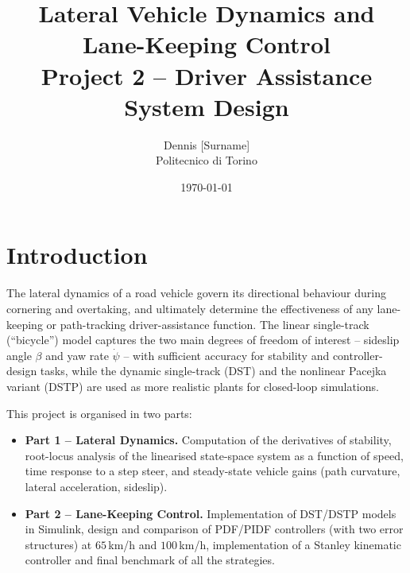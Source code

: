 %
%

\title{Lateral Vehicle Dynamics and Lane-Keeping Control \\ \large Project 2 -- Driver Assistance System Design}
\author{Dennis [Surname] \\ Politecnico di Torino}
\date{\today}
\maketitle

\section{Introduction}
The lateral dynamics of a road vehicle govern its directional behaviour
during cornering and overtaking, and ultimately determine the
effectiveness of any lane-keeping or path-tracking driver-assistance
function. The linear single-track (``bicycle'') model captures the
two main degrees of freedom of interest -- sideslip angle $\beta$ and
yaw rate $\dot\psi$ -- with sufficient accuracy for stability and
controller-design tasks, while the dynamic single-track (DST) and the
nonlinear Pacejka variant (DSTP) are used as more realistic plants for
closed-loop simulations.

This project is organised in two parts:
\begin{itemize}
    \item \textbf{Part 1 -- Lateral Dynamics.} Computation of the
          derivatives of stability, root-locus analysis of the
          linearised state-space system as a function of speed, time
          response to a step steer, and steady-state vehicle gains
          (path curvature, lateral acceleration, sideslip).
    \item \textbf{Part 2 -- Lane-Keeping Control.} Implementation of
          DST/DSTP models in Simulink, design and comparison of
          PDF/PIDF controllers (with two error structures) at
          $65$\,km/h and $100$\,km/h, implementation of a Stanley
          kinematic controller and final benchmark of all the
          strategies.
\end{itemize}

